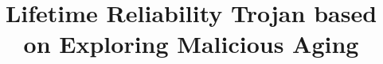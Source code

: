 \documentclass[9pt, conference]{IEEEtran}
\theoremstyle{mystyle}
\begin{document}
\title{Lifetime Reliability Trojan based on Exploring Malicious Aging}



\begin{comment}
\author{\IEEEauthorblockN{Tien-Hung Tseng, Shou-Chun Li and Kai-Chiang Wu}
	\IEEEauthorblockA{Department of Computer Science\\
	National Chiao Tung University, Hsinchu, Taiwan \\
	E-mail: \{eric830303.cs05g@g2.nctu.edu.tw, scli.cs02g@nctu.edu.tw and kcw@cs.nctu.edu.tw\}}
}
\end{comment}



\maketitle




%



%
%



\IEEEpeerreviewmaketitle



\printbibliography




\end{document}

